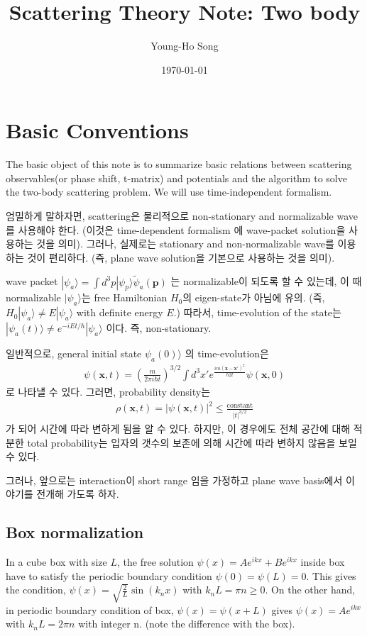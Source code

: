 \documentclass[10pt]{book}
\title{Scattering Theory Note: Two body}
\author{Young-Ho Song}
\date{\today}
\def\bm{\boldsymbol}
\newcommand{\bea}{\begin{eqnarray}}
\newcommand{\eea}{\end{eqnarray}}
\def\vp{{\bm p}}
\def\vx{{\bm x}}
\def\ra{\rangle}
\begin{document}
\maketitle
\tableofcontents
\newpage

\chapter{Basic Conventions}

The basic object of this note is to summarize basic 
relations between scattering
observables(or phase shift, t-matrix) and potentials
and the algorithm
to solve the two-body scattering problem. We will use 
time-independent formalism. 

엄밀하게 말하자면, scattering은 물리적으로 non-stationary and normalizable wave를 사용해야 한다. 
(이것은 time-dependent formalism 에 wave-packet solution을 사용하는 것을 의미). 그러나,
실제로는 stationary and non-normalizable wave를 이용하는 것이 편리하다. 
(즉, plane wave solution을 기본으로 사용하는 것을 의미). 

wave packet $|\psi_a\ra=\int d^3p |\psi_p\ra \tilde{\psi}_a(\vp)$ 는 
normalizable이 되도록 할 수 있는데, 이 때 normalizable $|\psi_a\ra$는 free Hamiltonian
$H_0$의 eigen-state가 아님에 유의. (즉, $H_0|\psi_a\ra\neq E|\psi_a\ra$ with 
definite energy $E$.) 따라서, time-evolution of the state는 
$|\psi_a(t)\ra\neq e^{-iEt/\hbar}|\psi_a\ra$ 이다. 즉, non-stationary. 

일반적으로, general initial state $\psi_a(0)\ra$ 의 time-evolution은 
\bea
\psi(\vx,t)= \left(\frac{m}{2\pi i \hbar t}\right)^{3/2}\int d^3 x' e^{\frac{i m(\vx-\vx')^2}{\hbar 2 t}} \psi(\vx,0) 
\eea 
로 나타낼 수 있다. 그러면, probability density는
\bea 
\rho(\vx,t)=|\psi(\vx,t)|^2\leq \frac{\mbox{constant}}{|t|^{3/2}}
\eea  
가 되어 시간에 따라 변하게 됨을 알 수 있다. 하지만, 이 경우에도 전체 공간에 대해 적분한
total probability는 입자의 갯수의 보존에 의해 시간에 따라 변하지 않음을 보일 수 있다.

그러나, 앞으로는 interaction이 short range 임을 가정하고 plane wave basis에서 
이야기를 전개해 가도록 하자. 

\section{Box normalization}
In a cube box with size $L$, the free solution $\psi(x)=Ae^{ikx}+Be^{ikx}$ inside box
have to satisfy the periodic boundary condition $\psi(0)=\psi(L)=0$. 
This gives the condition, $\psi(x)=\sqrt{\frac{2}{L}}\sin(k_n x)$ with $k_n L=\pi n\geq 0$. 
On the other hand, in periodic boundary condition of box, 
$\psi(x)=\psi(x+L)$ gives $\psi(x)=Ae^{ikx}$ with $k_n L=2\pi n$ with integer n.
(note the difference with the box). 
\end{document}
